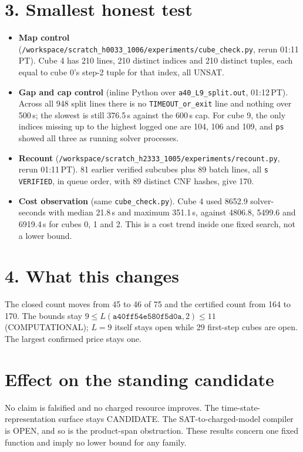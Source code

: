\documentclass[11pt]{article}
\begin{document}
\section*{3. Smallest honest test}
\begin{itemize}
\item \textbf{Map control} (\texttt{/workspace/scratch\_h0033\_1006/experiments/cube\_check.py}, rerun 01:11\,PT). Cube 4 has 210 lines, 210 distinct indices and 210 distinct tuples, each equal to cube 0's step-2 tuple for that index, all UNSAT.
\item \textbf{Gap and cap control} (inline Python over \texttt{a40\_L9\_split.out}, 01:12\,PT). Across all 948 split lines there is no \texttt{TIMEOUT\_or\_exit} line and nothing over 500\,s; the slowest is still 376.5\,s against the 600\,s cap. For cube 9, the only indices missing up to the highest logged one are 104, 106 and 109, and \texttt{ps} showed all three as running solver processes.
\item \textbf{Recount} (\texttt{/workspace/scratch\_h2333\_1005/experiments/recount.py}, rerun 01:11\,PT). 81 earlier verified subcubes plus 89 batch lines, all \texttt{s VERIFIED}, in queue order, with 89 distinct CNF hashes, give 170.
\item \textbf{Cost observation} (same \texttt{cube\_check.py}). Cube 4 used 8652.9 solver-seconds with median 21.8\,s and maximum 351.1\,s, against 4806.8, 5499.6 and 6919.4\,s for cubes 0, 1 and 2. This is a cost trend inside one fixed search, not a lower bound.
\end{itemize}

\section*{4. What this changes}
The closed count moves from 45 to 46 of 75 and the certified count from 164 to 170. The bounds stay $9\le L(\texttt{a40ff54e580f5d0a},2)\le 11$ (COMPUTATIONAL); $L=9$ itself stays open while 29 first-step cubes are open. The largest confirmed price stays one.

\section*{Effect on the standing candidate}
No claim is falsified and no charged resource improves. The time-state-representation surface stays CANDIDATE. The SAT-to-charged-model compiler is OPEN, and so is the product-span obstruction. These results concern one fixed function and imply no lower bound for any family.
\end{document}
